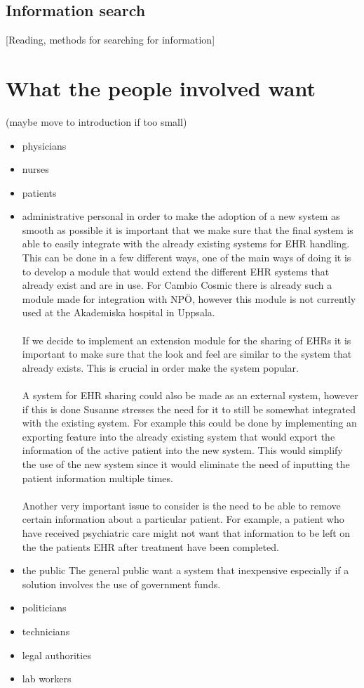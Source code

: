 \documentclass[14pt]{article}
\begin{document}
\subsection{Information search}
[Reading, methods for searching for information]

\newpage

\section{What the people involved want}
\label{sec:People}
(maybe move to introduction if too small)
\begin{itemize}
\item physicians
\item nurses
\item patients
\item administrative personal
in order to make the adoption of a new system as smooth as possible it is important that we make sure that the final system is able to easily integrate with the already existing systems for \gls{EHR} handling. This can be done in a few different ways, one of the main ways of doing it is to develop a module that would extend the different \gls{EHR} systems that already exist and are in use.\cite{EPJ2} For Cambio Cosmic there is already such a module made for integration with NPÖ, however this module is not currently used at the Akademiska hospital in Uppsala\cite{EPJ1}.
\\\\
If we decide to implement an extension module for the sharing of \glspl{EHR} it is important to make sure that the look and feel are similar to the system that already exists. This is crucial in order make the system popular. 
\\\\
A system for \gls{EHR} sharing could also be made as an external system, however if this is done Susanne stresses the need for it to still be somewhat integrated with the existing system. For example this could be done by implementing an exporting feature into the already existing system that would export the information of the active patient into the new system. This would simplify the use of the new system since it would eliminate the need of inputting the patient information multiple times.
\\\\
Another very important issue to consider is the need to be able to remove certain information about a particular patient. For example, a patient who have received psychiatric care might not want that information to be left on the the patients \gls{EHR} after treatment have been completed\cite{EPJ1}.
\item the public
The general public want a system that inexpensive especially if a solution involves the use of government funds.
\item politicians
\item technicians
\item legal authorities
\item lab workers
\end{itemize}
\end{document}
